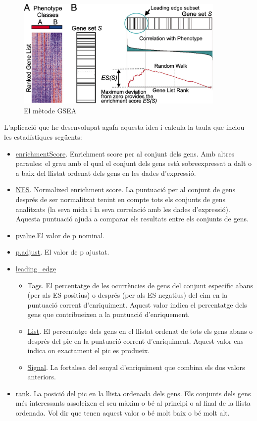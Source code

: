 \documentclass[]{article}
\begin{document}
\begin{figure}[H]
\centering
\includegraphics[width=0.9\textwidth]{GSEA_Method.jpg} 
\caption{El mètode GSEA}
\end{figure}

L'aplicació que he desenvolupat agafa aquesta idea i calcula la taula que inclou les estadístiques següents:

\begin{itemize}
\item \underline{enrichmentScore}. Enrichment score per al conjunt dels gens. Amb altres paraules: el grau amb el qual el conjunt dels gens està sobreexpressat a dalt o a baix del llistat ordenat dels gens en les dades d'expressió.
\item \underline{NES}. Normalized enrichment score. La puntuació per al conjunt de gens després de ser normalitzat tenint en compte tots els conjunts de gens analitzats (la seva mida i la seva correlació amb les dades d'expressió). Aquesta puntuació ajuda a comparar els resultats entre els conjunts de gens.
\item \underline{pvalue}.El valor de p nominal.
\item \underline{p.adjust}. El valor de p ajustat.
\item \underline{leading\_edge}
\begin{itemize}
\item \underline{Tags}. El percentatge de les ocurrències de gens del conjunt específic abans (per als ES positius) o després (per als ES negatius) del cim en la puntuació corrent d'enriquiment. Aquest valor indica el percentatge dels gens que contribueixen a la puntuació d'enriquement. 
\item \underline{List}. El percentatge dels gens en el llistat ordenat de tots els gens abans o després del pic en la puntuació corrent d'enriquiment. Aquest valor ens indica on exactament el pic es produeix. 
\item \underline{Signal}. La fortalesa del senyal d'enriquiment que combina els dos valors anteriors.
\end{itemize}
\item \underline{rank}. La posició del pic en la llista ordenada dels gens. Els conjunts dels gens més interessants assoleixen el seu màxim o bé al principi o al final de la llista ordenada. Vol dir que tenen aquest valor o bé molt baix o bé molt alt.
\end{itemize}
\end{document}
